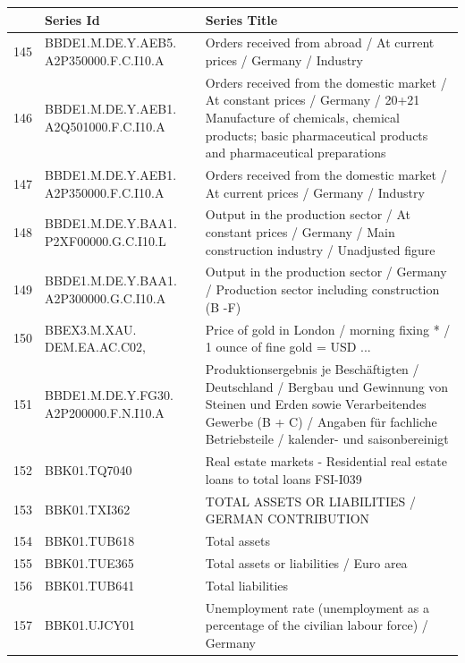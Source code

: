 \documentclass[11pt]{article}
\begin{document}
\begin{table}
\centering
\begin{tabular}{rp{5cm}p{11cm}}
& \textbf{Series Id} & \textbf{Series Title} \\
  \hline
  \hline
  145 & BBDE1.M.DE.Y.AEB5. A2P350000.F.C.I10.A & Orders received from abroad / At current prices / Germany / Industry \\ 
  \hline
  146 & BBDE1.M.DE.Y.AEB1. A2Q501000.F.C.I10.A & Orders received from the domestic market / At constant prices / Germany / 20+21 Manufacture of chemicals, chemical products; basic pharmaceutical products and pharmaceutical preparations \\ 
  \hline
  147 & BBDE1.M.DE.Y.AEB1. A2P350000.F.C.I10.A & Orders received from the domestic market / At current prices / Germany / Industry \\ 
  \hline
  148 & BBDE1.M.DE.Y.BAA1. P2XF00000.G.C.I10.L & Output in the production sector / At constant prices / Germany / Main construction industry / Unadjusted figure \\ 
  \hline
  149 & BBDE1.M.DE.Y.BAA1. A2P300000.G.C.I10.A & Output in the production sector / Germany / Production sector including construction (B -F) \\ 
  \hline
  150 & BBEX3.M.XAU. DEM.EA.AC.C02, & Price of gold in London / morning fixing * / 1 ounce of fine gold = USD ... \\ 
  \hline
  151 & BBDE1.M.DE.Y.FG30. A2P200000.F.N.I10.A & Produktionsergebnis je Beschäftigten / Deutschland / Bergbau und Gewinnung von Steinen und Erden sowie Verarbeitendes Gewerbe (B + C) / Angaben für fachliche Betriebsteile / kalender- und saisonbereinigt \\ 
  \hline
  152 & BBK01.TQ7040 & Real estate markets - Residential real estate loans to total loans                                        FSI-I039 \\ 
  \hline
  153 & BBK01.TXI362 & TOTAL ASSETS OR LIABILITIES / GERMAN CONTRIBUTION \\ 
  \hline
  154 & BBK01.TUB618 & Total assets \\ 
  \hline
  155 & BBK01.TUE365 & Total assets or liabilities / Euro area \\ 
  \hline
  156 & BBK01.TUB641 & Total liabilities \\ 
  \hline
  157 & BBK01.UJCY01 & Unemployment rate (unemployment as a percentage of the civilian labour force) / Germany \\ 
\end{tabular}
\end{table}
\end{document}

